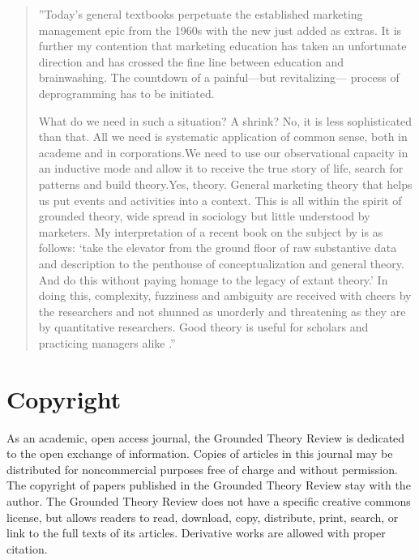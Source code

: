 \begin{quote}
''Today’s general textbooks perpetuate the established marketing
management epic from the 1960s with the new just added as extras. It
is further my contention that marketing education has taken an
unfortunate direction and has crossed the fine line between education
and brainwashing. The countdown of a painful—but revitalizing—
process of deprogramming has to be initiated.

What do we need in such a situation? A shrink? No, it is less
sophisticated than that. All we need is systematic application of
common sense, both in academe and in corporations.We need to use
our observational capacity in an inductive mode and allow it to receive
the true story of life, search for patterns and build theory.Yes, theory.
General marketing theory that helps us put events and activities into a
context. This is all within the spirit of grounded theory, wide spread in
sociology but little understood by marketers. My interpretation of a
recent book on the subject by 
\citep{book.glaser01}
is as follows: ‘take the
elevator from the ground floor of raw substantive data and description to
the penthouse of conceptualization and general theory. And do this
without paying homage to the legacy of extant theory.’ In doing this,
complexity, fuzziness and ambiguity are received with cheers by the
researchers and not shunned as unorderly and threatening as they are
by quantitative researchers. Good theory is useful for scholars and
practicing managers alike \citep[p. 132]{article.gummensson02}.''
\end{quote}

\section*{Copyright}

As an academic, open access journal,
the Grounded Theory Review is dedicated to the open exchange of information.
Copies of articles in this journal may be distributed for noncommercial purposes
free of charge and without permission.
The copyright of papers published in the Grounded Theory Review stay with the author.
The Grounded Theory Review does not have a specific creative commons license,
but allows readers to read, download, copy, distribute, print, search,
or link to the full texts of its articles.  Derivative works are allowed with proper citation.


\nocite{article.cynthia10}
\nocite{article.lowe97}
\nocite{article.morse95}
\nocite{book.glaser65}
\nocite{book.glaser93}
\nocite{book.glaser94}
\nocite{book.glaser95}





